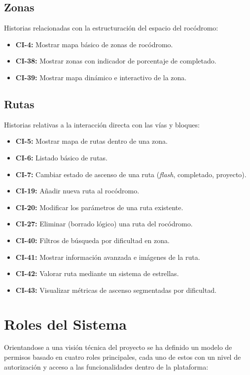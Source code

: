 \subsection{Zonas}
Historias relacionadas con la estructuración del espacio del rocódromo:
\begin{itemize}
    \item \textbf{CI-4:} Mostrar mapa básico de zonas de rocódromo.
    \item \textbf{CI-38:} Mostrar zonas con indicador de porcentaje de completado.
    \item \textbf{CI-39:} Mostrar mapa dinámico e interactivo de la zona.
\end{itemize}

\subsection{Rutas}
Historias relativas a la interacción directa con las vías y bloques:
\begin{itemize}
    \item \textbf{CI-5:} Mostrar mapa de rutas dentro de una zona.
    \item \textbf{CI-6:} Listado básico de rutas.
    \item \textbf{CI-7:} Cambiar estado de ascenso de una ruta (\textit{flash}, completado, proyecto).
    \item \textbf{CI-19:} Añadir nueva ruta al rocódromo.
    \item \textbf{CI-20:} Modificar los parámetros de una ruta existente.
    \item \textbf{CI-27:} Eliminar (borrado lógico) una ruta del rocódromo.
    \item \textbf{CI-40:} Filtros de búsqueda por dificultad en zona.
    \item \textbf{CI-41:} Mostrar información avanzada e imágenes de la ruta.
    \item \textbf{CI-42:} Valorar ruta mediante un sistema de estrellas.
    \item \textbf{CI-43:} Visualizar métricas de ascenso segmentadas por dificultad.
\end{itemize}

\section{Roles del Sistema}

Orientandose a una visión técnica del proyecto se ha definido un modelo de permisos basado en cuatro roles principales, cada uno de estos con un nivel de autorización y acceso a las funcionalidades dentro de la plataforma:

